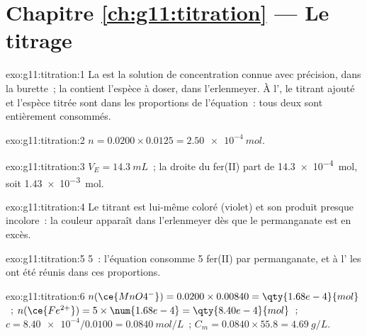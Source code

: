\section*{Chapitre \ref{ch:g11:titration} --- Le titrage}

\begin{solution}{exo:g11:titration:1}
La  est la solution de concentration connue avec
précision, dans la burette~; la  contient l'espèce à
doser, dans l'erlenmeyer. À l', le  titrant ajouté et
l'espèce titrée sont dans les proportions de l'équation~: tous deux
sont entièrement consommés.
\end{solution}

\begin{solution}{exo:g11:titration:2}
$n = 0.0200 \times 0.0125 = \qty{2.50e-4}{mol}$.
\end{solution}

\begin{solution}{exo:g11:titration:3}
$V_E = \qty{14.3}{mL}$~; la droite du fer(II) part de
\qty{14.3e-4}{mol}, soit \qty{1.43e-3}{mol}.
\end{solution}

\begin{solution}{exo:g11:titration:4}
Le  titrant est lui-même coloré (violet) et son produit presque
incolore~: la couleur apparaît dans l'erlenmeyer dès que le permanganate
est en excès.
\end{solution}

\begin{solution}{exo:g11:titration:5}
5~: l'équation consomme 5  fer(II) par  permanganate, et à
l' les  ont été réunis dans ces proportions.
\end{solution}

\begin{solution}{exo:g11:titration:6}
$n(\ce{MnO4^-}) = 0.0200 \times 0.00840 = \qty{1.68e-4}{mol}$~;
$n(\ce{Fe^{2+}}) = 5 \times \num{1.68e-4} = \qty{8.40e-4}{mol}$~;
$c = \num{8.40e-4} / 0.0100 = \qty{0.0840}{mol/L}$~;
$C_m = 0.0840 \times 55.8 = \qty{4.69}{g/L}$.
\end{solution}

